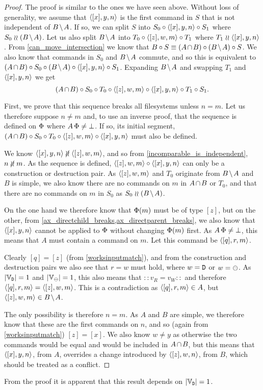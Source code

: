 \begin{proof}
The proof is similar to the ones we have seen above.
Without loss of generality, we assume that $\langle{[x],y,n}\rangle$ is the first command in $S$
that is not independent of $\bmanp$.
If so, we can split $S$ into $S_0\circ\langle{[x],y,n}\rangle\circ S_1$ where $S_0\indep\bma$.
Let us also split $\bmanp$ into $T_0\circ\langle{[z],w,m}\rangle\circ T_1$ where $T_1\mathrel{\wr\wr}\langle{[x],y,n}\rangle$.
From \cref{can_move_intersection} we know that
$B\cc S \equiv \acb\cc\bma\cc S$.
We also know that commands in $S_0$ and $\bmanp$ commute, and so this is equivalent to
$\acb\cc S_0\cc\bma\cc\cxynv\cc S_1$.
Expanding $\bmanp$ and swapping $T_1$ and $\langle{[x],y,n}\rangle$ we get
\[ (A\nobreak\hspace{-1pt plus 1pt}\nobreak\cap\nobreak\hspace{-1pt plus 1pt}\nobreak B)\circ S_0\circ T_0 \circ \langle{[z],w,m}\rangle \circ \langle{[x],y,n}\rangle\circ T_1\circ S_1. \]

First, we prove that this sequence breaks all filesystems
unless $n=m$.
Let us therefore suppose $n\neq m$ and, to use an inverse proof,
that the sequence is defined on $\Phi$ where $A\,\Phi\neq\bot$.
If so, its initial segment, $(A\nobreak\hspace{-1pt plus 1pt}\nobreak\cap\nobreak\hspace{-1pt plus 1pt}\nobreak B)\circ S_0\circ T_0 \circ \langle{[z],w,m}\rangle \circ \langle{[x],y,n}\rangle$ must also be defined.

We know $\cxynv\nindep\czwmv$, and so from \cref{incomparable_is_independent}, $n\nunrel m$.
As the sequence is defined, $\langle{[z],w,m}\rangle\circ\langle{[x],y,n}\rangle$ can only be a construction or destruction pair.
As $\langle{[z],w,m}\rangle$ and $T_0$ originate from $\bmanp$ and $B$ is simple, we also know there are
no commands on $m$ in $\acbnp$ or $T_0$,
and that there are no commands on $m$ in $S_0$ as $S_0\indep\bma$.

On the one hand we therefore know that $\Phi(m)$ must be of type $[z]$,
but on the other, from \cref{ax_directchild_breaks,ax_directparent_breaks},
we also know that $\langle{[x],y,n}\rangle$ cannot be applied to $\Phi$ without
changing $\Phi(m)$ first.
As $A\,\Phi\neq\bot$, this means that $A$ must contain a command on $m$.
Let this command be $\langle{[q],r,m}\rangle$.

Clearly $[q]=[z]$ (from \cref{worksinputmatch}), and from the construction and destruction
pairs we also see that $r=w$ must hold, where $w=\mathtt{D}$ or $w=\ominus$.
As $|\mathbb{V}_{\mathtt{D}}|=1$ and $|\mathbb{V}_{\ominus}|=1$, this also means that $::v_R=v_W::$ and therefore
$\langle{[q],r,m}\rangle = \langle{[z],w,m}\rangle$.
This is a contradiction as $\langle{[q],r,m}\rangle\in A$, but $\czwmv\in\bmanp$.

The only possibility is therefore $n=m$.
As $A$ and $B$ are simple, we therefore know that these are the first commands on $n$,
and so (again from \cref{worksinputmatch}) $[z]=[x]$.
We also know $w\neq y$ as otherwise the two commands would be equal and
would be included in $\acbnp$,
but this means that $\langle{[x],y,n}\rangle$, from $A$, overrides a change introduced 
by $\langle{[z],w,n}\rangle$, from $B$, which should be treated as a conflict.
\end{proof}

From the proof it is apparent that this result depends on $|\mathbb{V}_{\mathtt{D}}|=1$.

